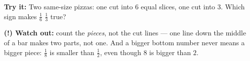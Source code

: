 \documentclass[12pt]{article}
\begin{document}
\begin{tryitbox}
\textbf{Try it:} \quad Two same-size pizzas: one cut into $6$ equal slices, one
cut into $3$. Which sign makes $\frac{1}{6}$ \underline{\hspace{1cm}}
$\frac{1}{3}$ true?\\[2pt]
\end{tryitbox}

\begin{watchoutbox}
\textbf{(!) Watch out:} count the \emph{pieces}, not the cut lines --- one line
down the middle of a bar makes two parts, not one. And a bigger bottom number
never means a bigger piece: $\frac{1}{8}$ is smaller than $\frac{1}{2}$, even
though $8$ is bigger than $2$.
\end{watchoutbox}
\end{document}
